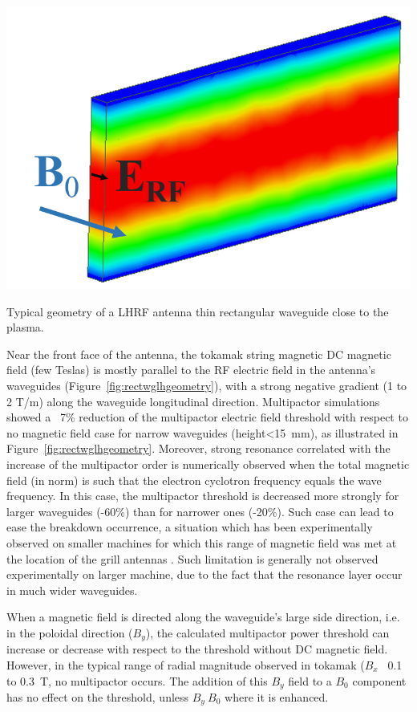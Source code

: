 \begin{marginfigure}
	\centering
	\includegraphics[width=0.9\linewidth]{figures/chap4/rectwg_LH_geometry}
	\caption{Typical geometry of a LHRF antenna thin rectangular waveguide close to the plasma.}
	\label{fig:rectwglhgeometry}
\end{marginfigure}
Near the front face of the antenna, the tokamak string magnetic DC magnetic field (few Teslas) is mostly parallel to the RF electric field in the antenna’s waveguides (Figure~\ref{fig:rectwglhgeometry}), with a strong negative gradient (1 to 2 T/m) along the waveguide longitudinal direction. Multipactor simulations showed a ~7\% reduction of the multipactor electric field threshold with respect to no magnetic field case for narrow waveguides (height<15~mm), as illustrated in Figure~\ref{fig:rectwglhgeometry}. Moreover, strong resonance correlated with the increase of the multipactor order is numerically observed when the total magnetic field (in norm) is such that the electron cyclotron frequency equals the wave frequency. In this case, the multipactor threshold is decreased more strongly for larger waveguides (-60\%) than for narrower ones (-20\%). Such case can lead to ease the breakdown occurrence, a situation which has been experimentally observed on smaller machines for which this range of magnetic field was met at the location of the grill antennas . Such limitation is generally not observed experimentally on larger machine, due to the fact that the resonance layer occur in much wider waveguides. 

When a magnetic field is directed along the waveguide’s large side direction, i.e. in the poloidal direction ($B_y$), the calculated multipactor power threshold can increase or decrease with respect to the threshold without DC magnetic field. However, in the typical range of radial magnitude observed in tokamak ($B_x$ ~0.1 to 0.3~T, no multipactor occurs. The addition of this $B_y$ field to a $B_0$ component has no effect on the threshold, unless $B_y ~ B_0$ where it is enhanced. 

